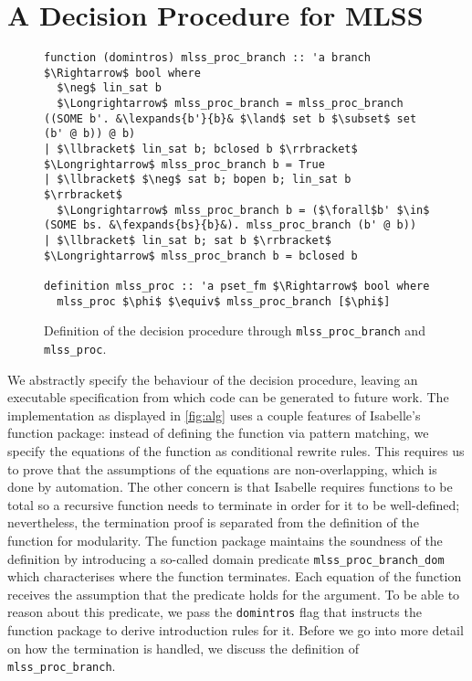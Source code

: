 \documentclass[sigplan,10pt,anonymous,review]{acmart}
\newcommand{\lefttrianglebar}{\mathrel{\tikz[baseline]{\draw (1ex, 0.75ex) -- (0, 1.25ex) -- (0, 0.25ex) -- cycle; \draw (0, 0.75ex) -- (1ex, 0.75ex);}}}
\newcommand{\lefttriangle}{\mathrel{\tikz[baseline]{\draw (1ex, 0.75ex) -- (0, 1.25ex) -- (0, 0.25ex) -- cycle;}}}
\newcommand{\lexpands}[2]{#1 $\lefttriangle$ #2}
\newcommand{\fexpands}[2]{#1 $\lefttrianglebar$ #2}
\begin{document}
\section{A Decision Procedure for MLSS}
\begin{figure*}
  \centering
\begin{lstlisting}
function (domintros) mlss_proc_branch :: 'a branch $\Rightarrow$ bool where
  $\neg$ lin_sat b
  $\Longrightarrow$ mlss_proc_branch = mlss_proc_branch ((SOME b'. &\lexpands{b'}{b}& $\land$ set b $\subset$ set (b' @ b)) @ b)
| $\llbracket$ lin_sat b; bclosed b $\rrbracket$ $\Longrightarrow$ mlss_proc_branch b = True
| $\llbracket$ $\neg$ sat b; bopen b; lin_sat b $\rrbracket$
  $\Longrightarrow$ mlss_proc_branch b = ($\forall$b' $\in$ (SOME bs. &\fexpands{bs}{b}&). mlss_proc_branch (b' @ b))
| $\llbracket$ lin_sat b; sat b $\rrbracket$ $\Longrightarrow$ mlss_proc_branch b = bclosed b

definition mlss_proc :: 'a pset_fm $\Rightarrow$ bool where
  mlss_proc $\phi$ $\equiv$ mlss_proc_branch [$\phi$]
\end{lstlisting}
\caption{Definition of the decision procedure through \lstinline|mlss_proc_branch| and \lstinline|mlss_proc|.\label{fig:alg}}
\end{figure*}

\noindent We abstractly specify the behaviour of the decision procedure, leaving an executable specification from which code can be generated to future work.
The implementation as displayed in \autoref{fig:alg} uses a couple features of Isabelle's function package:
instead of defining the function via pattern matching, we specify the equations of the function as conditional rewrite rules.
This requires us to prove that the assumptions of the equations are non-overlapping, which is done by automation.
The other concern is that Isabelle requires functions to be total so a recursive function needs to terminate in order for it to be well-defined;
nevertheless, the termination proof is separated from the definition of the function for modularity.
The function package maintains the soundness of the definition by introducing a so-called domain predicate \lstinline!mlss_proc_branch_dom! which characterises where the function terminates.
Each equation of the function receives the assumption that the predicate holds for the argument.
To be able to reason about this predicate, we pass the \lstinline!domintros! flag that instructs the function package to derive introduction rules for it.
Before we go into more detail on how the termination is handled, we discuss the definition of \lstinline!mlss_proc_branch!.
\end{document}
